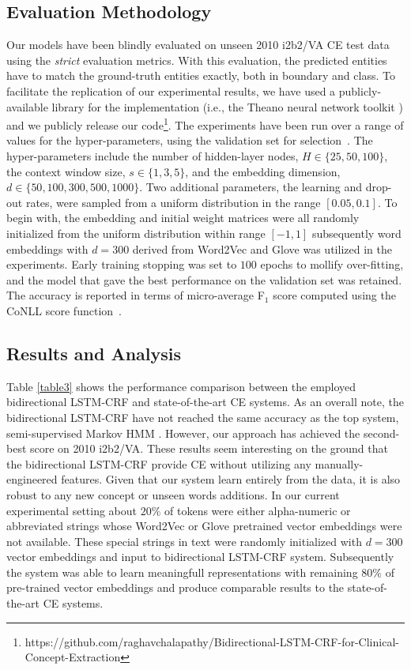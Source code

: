 \documentclass[11pt]{article}
\begin{document}
\subsection{Evaluation Methodology}
\label{sec:length}
Our models have been blindly evaluated on unseen 2010 i2b2/VA  CE test data using the \textit{strict} evaluation metrics. With this evaluation, the predicted entities have to match the ground-truth entities exactly, both in boundary and class. To facilitate the replication of our experimental results, we have used a publicly-available library for the implementation (i.e., the Theano neural network toolkit \cite{bergstra2010theano}) and we publicly release our code\footnote{\hspace{-0.65cm}https://github.com/raghavchalapathy/Bidirectional-LSTM-CRF-for-Clinical-Concept-Extraction}. The experiments have been run over a range of values for the hyper-parameters, using the validation set for selection~\cite{bergstra2012random}. The hyper-parameters include the number of hidden-layer nodes, $H \in \{25, 50, 100\}$, the context window size, $s \in \{1, 3, 5\}$, and the embedding dimension, $d \in \{50, 100, 300, 500, 1000\}$. Two additional parameters, the learning and drop-out rates, were sampled from a uniform distribution in the range $[0.05, 0.1]$. To begin with, the embedding and initial weight matrices were all randomly initialized from the uniform distribution within range $[-1, 1]$ subsequently word embeddings with $d= 300$ derived from Word2Vec and Glove was utilized in the experiments. Early training stopping was set to $100$ epochs to mollify over-fitting, and the model that gave the best performance on the validation set was retained. The accuracy is reported in terms of micro-average F$_1$ score computed using the CoNLL score function~\cite{Nadeau:07}.

\subsection{Results and Analysis}

Table \ref{table3} shows the performance comparison between the employed bidirectional LSTM-CRF and state-of-the-art CE systems. As an overall note, the bidirectional LSTM-CRF have not reached the same accuracy as the top system, semi-supervised Markov HMM  \cite{de2011machine}. However, our approach has achieved the second-best score on 2010 i2b2/VA. These results seem interesting on the ground that the bidirectional LSTM-CRF provide CE without utilizing any manually-engineered features. Given that our system learn entirely from the data, it is also robust to any new concept or unseen words additions. In our current experimental setting about $20\%$ of tokens were either alpha-numeric or abbreviated strings whose Word2Vec or  Glove pretrained vector embeddings were not available. These special strings in text were randomly initialized with $d=300$ vector embeddings and input to bidirectional LSTM-CRF system. Subsequently the system was able to learn  meaningfull representations with remaining $80\%$ of pre-trained vector embeddings and produce comparable results to the state-of-the-art CE systems.
\end{document}
